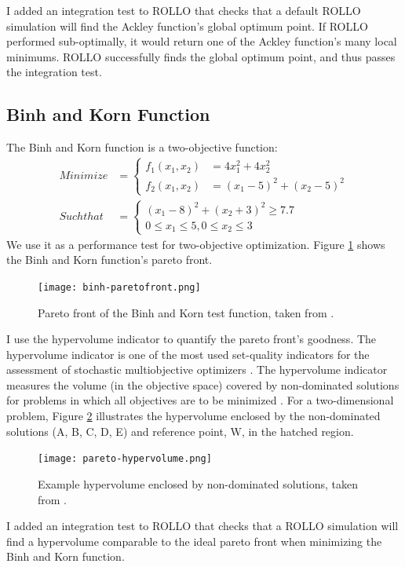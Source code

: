 I added an integration test to \gls{ROLLO} that checks that a default \gls{ROLLO} 
simulation will find the Ackley function's global optimum point. 
If \gls{ROLLO} performed sub-optimally, it would return one of the Ackley 
function's many local minimums. 
\gls{ROLLO} successfully finds the global optimum point, and thus passes the 
integration test. 

\subsection{Binh and Korn Function}
The Binh and Korn function \cite{binh_mobes_1997} is a two-objective function:
\begin{align}
    Minimize &= \begin{cases}
        f_1 (x_1,x_2) &= 4x_1^2+4x_2^2 \\
        f_2 (x_1,x_2) &= (x_1-5)^2 + (x_2-5)^2 
    \end{cases} \\
    Such that &= \begin{cases}
        (x_1-8)^2 + (x_2+3)^2 \geq 7.7 \nonumber \\
        0 \leq x_1 \leq 5, 0 \leq x_2 \leq 3 \nonumber
    \end{cases}
\end{align}
We use it as a performance test for two-objective optimization.
Figure \ref{fig:binh_paretofront} shows the Binh and Korn function's pareto front.
\begin{figure}[]
    \centering
    \texttt{[image: binh-paretofront.png]} 
    \caption{Pareto front of the Binh and Korn test function, taken from 
    \cite{bassi_statistics_2018}. }
    \label{fig:binh_paretofront}
\end{figure}
I use the hypervolume indicator to quantify the pareto front's goodness. 
The hypervolume indicator is one of the most used set-quality indicators for the 
assessment of stochastic multiobjective optimizers \cite{guerreiro_hypervolume_2020}.
The hypervolume indicator measures the volume (in the objective space) covered by 
non-dominated solutions for problems in which all objectives are to be 
minimized \cite{deb_multi-objective_2001}. 
For a two-dimensional problem, Figure \ref{fig:pareto_hypervolume} illustrates the 
hypervolume enclosed by the non-dominated solutions (A, B, C, D, E) and reference 
point, W, in the hatched region. 
\begin{figure}[]
    \centering
    \texttt{[image: pareto-hypervolume.png]} 
    \caption{Example hypervolume enclosed by non-dominated solutions, taken from 
    \cite{deb_multi-objective_2001}.}
    \label{fig:pareto_hypervolume}
\end{figure}
I added an integration test to ROLLO that checks that a ROLLO simulation will 
find a hypervolume comparable to the ideal pareto front when minimizing the
Binh and Korn function. 

